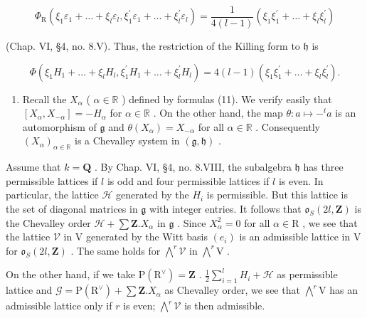 \[
\Phi_ {\mathrm{R}} \left(\xi_ {1} \varepsilon_ {1} + \dots + \xi_ {l} \varepsilon_ {l}, \xi_ {1} ^ {\prime} \varepsilon_ {1} + \dots + \xi_ {l} ^ {\prime} \varepsilon_ {l}\right) = \frac {1}{4 (l - 1)} \left(\xi_ {1} \xi_ {1} ^ {\prime} + \dots + \xi_ {l} \xi_ {l} ^ {\prime}\right)
\]

(Chap. VI, §4, no. 8.V). Thus, the restriction of the Killing form to \(\mathfrak{h}\) is

\[
\Phi \left(\xi_ {1} H _ {1} + \dots + \xi_ {l} H _ {l}, \xi_ {1} ^ {\prime} H _ {1} + \dots + \xi_ {l} ^ {\prime} H _ {l}\right) = 4 (l - 1) \left(\xi_ {1} \xi_ {1} ^ {\prime} + \dots + \xi_ {l} \xi_ {l} ^ {\prime}\right).
\]

\begin{enumerate}
\def\labelenumi{(\Roman{enumi})}
\setcounter{enumi}{8}
\tightlist
\item
  Recall the \(X_{\alpha}\) ( \(\alpha \in \mathbb{R}\) ) defined by formulas (11). We verify easily that \([X_{\alpha}, X_{-\alpha}] = -H_{\alpha}\) for \(\alpha \in \mathbb{R}\) . On the other hand, the map \(\theta : a \mapsto -^{t}a\) is an automorphism of \(\mathfrak{g}\) and \(\theta(X_{\alpha}) = X_{-\alpha}\) for all \(\alpha \in \mathbb{R}\) . Consequently \((X_{\alpha})_{\alpha \in \mathbb{R}}\) is a Chevalley system in \((\mathfrak{g}, \mathfrak{h})\) .
\end{enumerate}

Assume that \(k = \mathbf{Q}\) . By Chap. VI, §4, no. 8.VIII, the subalgebra \(\mathfrak{h}\) has three permissible lattices if \(l\) is odd and four permissible lattices if \(l\) is even. In particular, the lattice \(\mathcal{H}\) generated by the \(H_i\) is permissible. But this lattice is the set of diagonal matrices in \(\mathfrak{g}\) with integer entries. It follows that \(\mathfrak{o}_S(2l,\mathbf{Z})\) is the Chevalley order \(\mathcal{H} + \sum \mathbf{Z}.X_\alpha\) in \(\mathfrak{g}\) . Since \(X_{\alpha}^{2} = 0\) for all \(\alpha \in \mathrm{R}\) , we see that the lattice \(\mathcal{V}\) in \(\mathrm{V}\) generated by the Witt basis \((e_i)\) is an admissible lattice in \(\mathrm{V}\) for \(\mathfrak{o}_S(2l,\mathbf{Z})\) . The same holds for \(\bigwedge^r\mathcal{V}\) in \(\bigwedge^r\mathrm{V}\) .

On the other hand, if we take \(\mathrm{P}(\mathrm{R}^{\vee}) = \mathbf{Z}\) . \(\frac{1}{2} \sum_{i=1}^{l} H_i + \mathcal{H}\) as permissible lattice and \(\mathcal{G} = \mathrm{P}(\mathrm{R}^{\vee}) + \sum \mathbf{Z}. X_{\alpha}\) as Chevalley order, we see that \(\bigwedge^r \mathrm{V}\) has an admissible lattice only if \(r\) is even; \(\bigwedge^r \mathcal{V}\) is then admissible.

